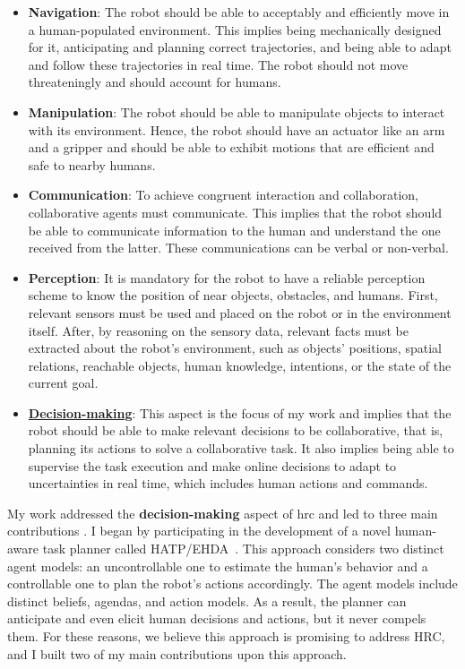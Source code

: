 \begin{itemize}
    \item \textbf{Navigation}: The robot should be able to acceptably and efficiently move in a human-populated environment. This implies being mechanically designed for it, anticipating and planning correct trajectories, and being able to adapt and follow these trajectories in real time. The robot should not move threateningly and should account for humans.

    \item \textbf{Manipulation}: The robot should be able to manipulate objects to interact with its environment. Hence, the robot should have an actuator like an arm and a gripper and should be able to exhibit motions that are efficient and safe to nearby humans.

    \item \textbf{Communication}: To achieve congruent interaction and collaboration, collaborative agents must communicate. This implies that the robot should be able to communicate information to the human and understand the one received from the latter. These communications can be verbal or non-verbal.

    \item \textbf{Perception}: It is mandatory for the robot to have a reliable perception scheme to know the position of near objects, obstacles, and humans. First, relevant sensors must be used and placed on the robot or in the environment itself. After, by reasoning on the sensory data, relevant facts must be extracted about the robot's environment, such as objects' positions, spatial relations, reachable objects, human knowledge, intentions, or the state of the current goal. 
    
    \item \uline{\textbf{Decision-making}}: This aspect is the focus of my work and implies that the robot should be able to make relevant decisions to be collaborative, that is, planning its actions to solve a collaborative task. It also implies being able to supervise the task execution and make online decisions to adapt to uncertainties in real time, which includes human actions and commands. 

\end{itemize}
    

My work addressed the \textbf{decision-making} aspect of \acrshort{hrc} and led to three main contributions .
I began by participating in the development of a novel human-aware task planner called HATP/EHDA~\cite{buisan_hatpehda_icra}. This approach considers two distinct agent models: an uncontrollable one to estimate the human's behavior and a controllable one to plan the robot's actions accordingly. The agent models include distinct beliefs, agendas, and action models. As a result, the planner can anticipate and even elicit human decisions and actions, but it never compels them. For these reasons, we believe this approach is promising to address HRC, and I built two of my main contributions upon this approach.

